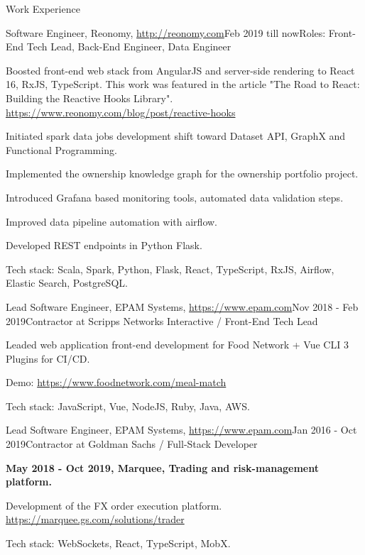 \documentclass{resume}
\begin{document}
\begin{rSection}{Work Experience}

\begin{rSubsection}{Software Engineer, Reonomy, \url{http://reonomy.com}}{Feb 2019 till now}{Roles: Front-End Tech Lead, Back-End Engineer, Data Engineer}{}
\item Boosted front-end web stack from AngularJS and server-side rendering to React 16, RxJS, TypeScript.
This work was featured in the article "The Road to React: Building the Reactive Hooks Library".
\url{https://www.reonomy.com/blog/post/reactive-hooks}
\item Initiated spark data jobs development shift toward Dataset API, GraphX and Functional Programming.
\item Implemented the ownership knowledge graph for the ownership portfolio project.
\item Introduced Grafana based monitoring tools, automated data validation steps.
\item Improved data pipeline automation with airflow.
\item Developed REST endpoints in Python Flask.

Tech stack: Scala, Spark, Python, Flask, React, TypeScript, RxJS, Airflow, Elastic Search, PostgreSQL.
\end{rSubsection}

\begin{rSubsection}{Lead Software Engineer, EPAM Systems, \url{https://www.epam.com}}{Nov 2018 - Feb 2019}{Contractor at Scripps Networks Interactive / Front-End Tech Lead}{}
\item Leaded web application front-end development for Food Network + Vue CLI 3 Plugins for CI/CD.

Demo: \url{https://www.foodnetwork.com/meal-match}

Tech stack: JavaScript, Vue, NodeJS, Ruby, Java, AWS.
\end{rSubsection}

\begin{rSubsection}{Lead Software Engineer, EPAM Systems, \url{https://www.epam.com}}{Jan 2016 - Oct 2019}{Contractor at Goldman Sachs / Full-Stack Developer}{}
\item[] \textbf{May 2018 - Oct 2019, Marquee, Trading and risk-management platform.}
\item Development of the FX order execution platform. \url{https://marquee.gs.com/solutions/trader}

Tech stack: WebSockets, React, TypeScript, MobX.


\end{rSubsection}
\end{rSection}
\end{document}
